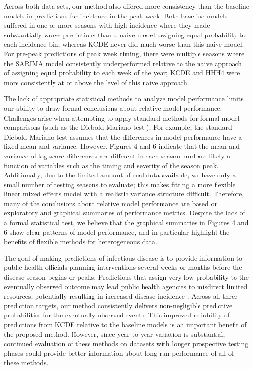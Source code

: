 \documentclass[times, doublespace]{simauth}\usepackage[]{graphicx}\usepackage[]{color}
\begin{document}
Across both data sets, our method also offered more consistency than the
baseline models in predictions for incidence in the peak week.  Both baseline
models suffered in one or more seasons with high incidence where they made
substantially worse predictions than a naive model
assigning equal probability to each incidence bin, whereas KCDE never did much
worse than this naive model.  For pre-peak predictions of peak week timing,
there were multiple seasons where the SARIMA model consistently underperformed
relative to the naive approach of assigning equal probability to each week of
the year; KCDE and HHH4 were more consistently at or above the level of this
naive approach.

The lack of appropriate statistical methods to analyze model performance limits
our ability to draw formal conclusions about relative model performance.
Challenges arise when attempting to apply standard methods for formal model
comparisons (such as the Diebold-Mariano test
\cite{diebold2002comparingPredictiveAccuracy}). For example, the standard
Diebold-Mariano test assumes that the differences in model performance have a
fixed mean and variance.  However, Figures 4 and 6 indicate that the mean and
variance of log score differences are different in each season, and are likely
a function of variables such as the timing and severity of the season peak.
Additionally, due to the limited amount of real data available, we have only a
small number of testing seasons to evaluate; this makes fitting a more flexible
linear mixed effects model with a realistic variance structure difficult.
Therefore, many of the conclusions about relative model performance are based on
exploratory and graphical summaries of performance metrics. Despite the lack of
a formal statistical test, we believe that the graphical summaries in Figures 4
and 6 show clear patterns of model performance, and in particular highlight the
benefits of flexible methods for heterogeneous data.

The goal of making predictions of infectious disease is to provide information to
public health officials planning interventions several weeks or
months before the disease season begins or peaks.
Predictions that assign very low probability to the eventually observed outcome
may lead public health agencies to misdirect limited resources, potentially resulting
in increased disease incidence \cite{biggerstaff2016resultsCDC20132014InfluenzaChallenge}.
Across all three prediction targets, our method consistently delivers
non-negligible predictive probabilities for the eventually observed events.
This improved reliability of predictions from KCDE relative to the baseline models is an important
benefit of the proposed method.  However, since year-to-year
variation is substantial, continued evaluation of these methods on datasets with
longer prospective testing phases could provide better information about
long-run performance of all of these methods.
\end{document}
